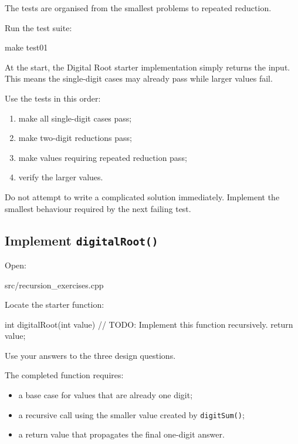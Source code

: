 \documentclass{csc2059practical}
\begin{document}
The tests are organised from the smallest problems to repeated reduction.

Run the test suite:

\begin{terminal}
make test01
\end{terminal}

At the start, the Digital Root starter implementation simply returns the input.
This means the single-digit cases may already pass while larger values fail.

Use the tests in this order:

\begin{enumerate}
    \item make all single-digit cases pass;
    \item make two-digit reductions pass;
    \item make values requiring repeated reduction pass;
    \item verify the larger values.
\end{enumerate}

Do not attempt to write a complicated solution immediately. Implement the
smallest behaviour required by the next failing test.

\subsection{Implement \texttt{digitalRoot()}}

Open:

\begin{terminal}
src/recursion_exercises.cpp
\end{terminal}

Locate the starter function:

\begin{cppcode}
int digitalRoot(int value)
{
    // TODO: Implement this function recursively.
    return value;
}
\end{cppcode}

Use your answers to the three design questions.

The completed function requires:

\begin{itemize}
    \item a base case for values that are already one digit;
    \item a recursive call using the smaller value created by
          \texttt{digitSum()};
    \item a return value that propagates the final one-digit answer.
\end{itemize}
\end{document}
